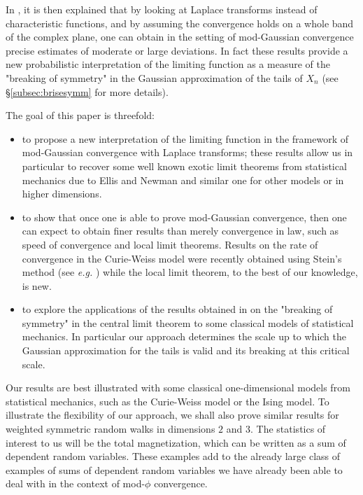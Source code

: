 \documentclass[12pt,a4paper,reqno]{amsart}
\theoremstyle{remark}
\begin{document}
In \cite{FMN13}, it is then explained that by looking at Laplace transforms instead of characteristic functions, and by assuming the convergence holds on a whole band of the complex plane, one can obtain in the setting of mod-Gaussian convergence precise estimates of moderate or large deviations. In fact these results provide a new probabilistic interpretation of the limiting function as a measure of the "breaking of symmetry"  in the Gaussian approximation of the tails of $X_n$ (see \S\ref{subsec:brisesymm} for more details).
\bigskip

The goal of this paper is threefold:\vspace{2mm}
\begin{itemize}
\item to propose a new interpretation of the limiting function in the framework of mod-Gaussian convergence with Laplace transforms; these results allow us in particular to recover some well known exotic limit theorems from statistical mechanics due to Ellis and Newman \cite{EN78} and similar one for other models or in higher dimensions.\vspace{2mm}
\item to show that once one is able to prove mod-Gaussian convergence, then one can expect to obtain finer results than merely convergence in law, such as speed of convergence and local limit theorems. Results on the rate of convergence in the Curie-Weiss model were recently obtained using Stein's method (see \emph{e.g.} \cite{EL10}) while the local limit theorem, to the best of our knowledge, is new.\vspace{2mm}
\item to explore the applications of the results obtained in \cite{FMN13} on the "breaking of symmetry" in the central limit theorem  to some classical models of statistical mechanics. In particular our approach determines the scale up to which the Gaussian approximation for the tails is valid and its breaking at this critical scale.\vspace{2mm}
\end{itemize}
Our results are best illustrated with some classical one-dimensional models from statistical mechanics, such as the Curie-Weiss model or the Ising model. To illustrate the flexibility of our approach, we shall also prove similar results for weighted symmetric random walks in dimensions $2$ and $3$. The statistics of interest to us will be the total magnetization, which can be written as a sum of dependent random variables. These examples add to the already large class of examples of sums of dependent random variables we have already been able to deal with in the context of mod-$\phi$ convergence. 
\bigskip
\end{document}
